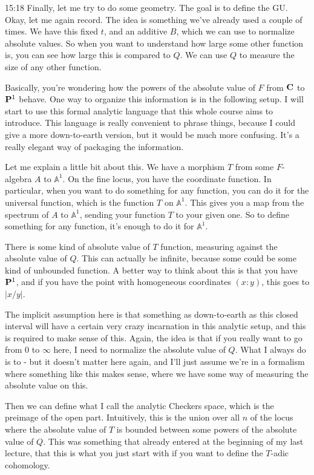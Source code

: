 \begin{unfinished}{15:18}
Finally, let me try to do some geometry. The goal is to define the GU. Okay, let me again record. The idea is something we've already used a couple of times. We have this fixed $t$, and an additive $B$, which we can use to normalize absolute values. So when you want to understand how large some other function is, you can see how large this is compared to $Q$. We can use $Q$ to measure the size of any other function.

Basically, you're wondering how the powers of the absolute value of $F$ from $\C$ to $\P^1$ behave. One way to organize this information is in the following setup. I will start to use this formal analytic language that this whole course aims to introduce. This language is really convenient to phrase things, because I could give a more down-to-earth version, but it would be much more confusing. It's a really elegant way of packaging the information.

Let me explain a little bit about this. We have a morphism $T$ from some $F$-algebra $A$ to $\mathbb{A}^1$. On the fine locus, you have the coordinate function. In particular, when you want to do something for any function, you can do it for the universal function, which is the function $T$ on $\mathbb{A}^1$. This gives you a map from the spectrum of $A$ to $\mathbb{A}^1$, sending your function $T$ to your given one. So to define something for any function, it's enough to do it for $\mathbb{A}^1$.

There is some kind of absolute value of $T$ function, measuring against the absolute value of $Q$. This can actually be infinite, because some could be some kind of unbounded function. A better way to think about this is that you have $\P^1$, and if you have the point with homogeneous coordinates $(x:y)$, this goes to $|x/y|$.

The implicit assumption here is that something as down-to-earth as this closed interval will have a certain very crazy incarnation in this analytic setup, and this is required to make sense of this. Again, the idea is that if you really want to go from 0 to $\infty$ here, I need to normalize the absolute value of $Q$. What I always do is to - but it doesn't matter here again, and I'll just assume we're in a formalism where something like this makes sense, where we have some way of measuring the absolute value on this.

Then we can define what I call the analytic Checkers space, which is the preimage of the open part. Intuitively, this is the union over all $n$ of the locus where the absolute value of $T$ is bounded between some powers of the absolute value of $Q$. This was something that already entered at the beginning of my last lecture, that this is what you just start with if you want to define the $T$-adic cohomology.


\end{unfinished}
